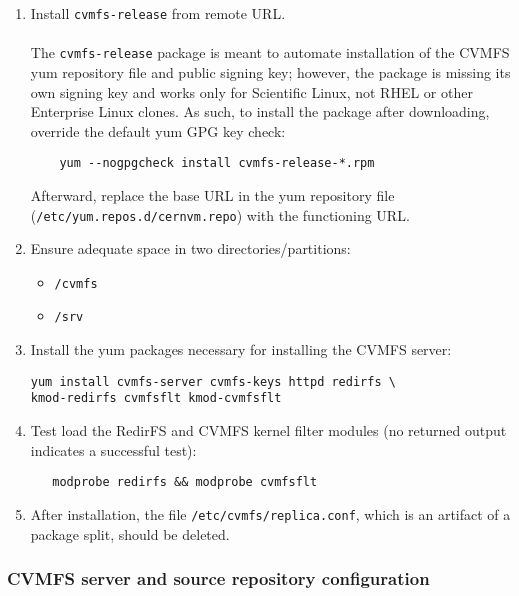 \documentclass{article}
\begin{document}
\begin{enumerate}
    \item Install \verb+cvmfs-release+ from remote URL. \\
            \\
          The \verb+cvmfs-release+ package is meant to automate installation of the CVMFS yum repository file and public signing key; 
          however, the package is missing its own signing key and works only for Scientific Linux, not RHEL or other Enterprise Linux clones.  
          As such, to install the package after downloading, override the default yum GPG key check: 
          \begin{verbatim}
    yum --nogpgcheck install cvmfs-release-*.rpm
          \end{verbatim}
          Afterward, replace the base URL in the yum repository file (\verb+/etc/yum.repos.d/cernvm.repo+) with the functioning URL.

    \item Ensure adequate space in two directories/partitions: 
          \begin{itemize}
                \item \verb+/cvmfs+
                \item \verb+/srv+
          \end{itemize}
        
    \item Install the yum packages necessary for installing the CVMFS server:
          \begin{verbatim}
yum install cvmfs-server cvmfs-keys httpd redirfs \ 
kmod-redirfs cvmfsflt kmod-cvmfsflt
          \end{verbatim}

    \item Test load the RedirFS and CVMFS kernel filter modules (no returned output indicates a successful test):
          \begin{verbatim}
   modprobe redirfs && modprobe cvmfsflt
          \end{verbatim}

    \item After installation, the file \verb+/etc/cvmfs/replica.conf+, which is an artifact of a package split,
          should be deleted.
\end{enumerate}

\subsubsection{CVMFS server and source repository configuration} 
\end{document}
